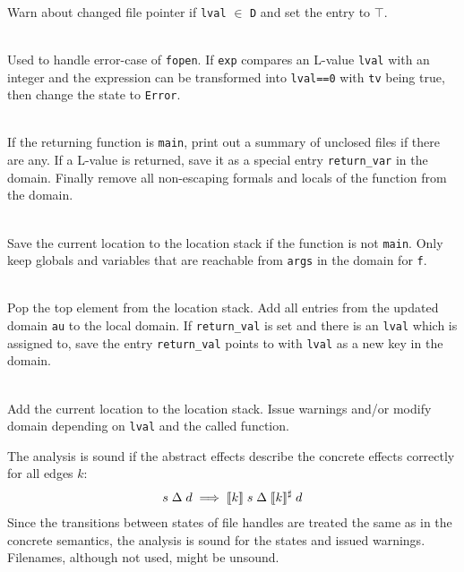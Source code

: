 \begin{description}
\item {}\\
Warn about changed file pointer if \verb|lval| $\in$ \verb|D| and set the entry to $\top$.

\item {}\\
Used to handle error-case of \verb|fopen|. If \verb|exp| compares an L-value \verb|lval| with an integer and the expression can be transformed into \verb|lval==0| with \verb|tv| being true, then change the state to \verb|Error|.


\item {}\\
If the returning function is \verb|main|, print out a summary of unclosed files if there are any.
If a L-value is returned, save it as a special entry \verb|return_var| in the domain.
Finally remove all non-escaping formals and locals of the function from the domain.

\item {}\\
Save the current location to the location stack if the function is not \verb|main|. Only keep globals and variables that are reachable from \verb|args| in the domain for \verb|f|.

\item {}\\
Pop the top element from the location stack.
Add all entries from the updated domain \verb|au| to the local domain.
If \verb|return_val| is set and there is an \verb|lval| which is assigned to, save the entry \verb|return_val| points to with \verb|lval| as a new key in the domain.

\item {}\\
Add the current location to the location stack. Issue warnings and/or modify domain depending on \verb|lval| and the called function.
\end{description}

The analysis is sound if the abstract effects describe the concrete effects correctly for all edges $k$:
\begin{align}
s \;\Delta\; d \implies \llbracket k \rrbracket \; s \;\Delta\; \llbracket k \rrbracket^\sharp \; d
\end{align}
Since the transitions between states of file handles are treated the same as in the concrete semantics, the analysis is sound for the states and issued warnings. Filenames, although not used, might be unsound.



